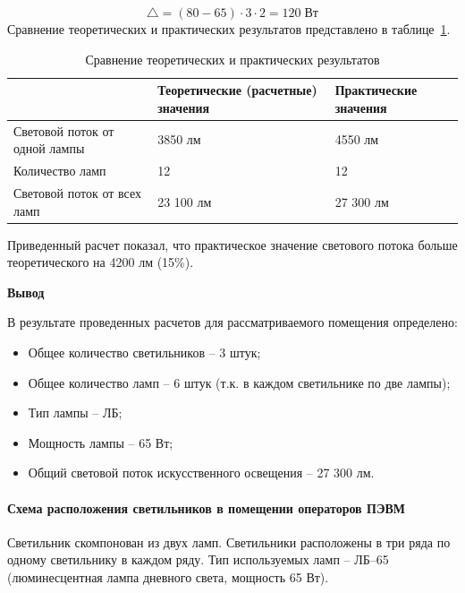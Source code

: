 \begin{enumerate}
$$ \triangle = (80 - 65) \cdot 3 \cdot 2 = 120 \; Вт$$
Сравнение теоретических и практических результатов представлено в таблице~\ref{bzd:srav}.

 \begin{table}[htbp]
    \centering
    \caption{Сравнение теоретических и практических результатов}\label{bzd:srav}%
      \begin{tabular}{|p{4cm}|p{5cm}|p{5cm}|}
      \hline
       & \textbf{Теоретические (расчетные) значения} & \textbf{Практические значения} \\
      \hline
      Световой поток от одной лампы & 3850 лм & 4550 лм \\
      \hline
      Количество ламп & 12 & 12 \\
      \hline
      Световой поток от всех ламп & 23 100 лм & 27 300 лм \\
      \hline
      \end{tabular}%
    
  \end{table}%
  Приведенный расчет показал, что практическое значение светового потока больше теоретического на 4200 лм (15\%).
\end{enumerate}
 
  \textbf{Вывод}
  
  В результате проведенных расчетов для рассматриваемого помещения определено:
  \begin{itemize}
  \item Общее количество светильников – 3 штук;
  \item Общее количество ламп – 6 штук (т.к. в каждом светильнике по две лампы);
  \item 	Тип лампы – ЛБ;
  \item Мощность лампы – 65 Вт;
  \item Общий световой поток искусственного освещения – 27 300 лм.
  \end{itemize}

\paragraph{Схема расположения светильников в помещении операторов ПЭВМ}

Светильник скомпонован из двух ламп. Светильники расположены в три ряда по одному светильнику в каждом ряду. Тип используемых ламп – ЛБ–65 (люминесцентная лампа дневного света, мощность 65 Вт).

